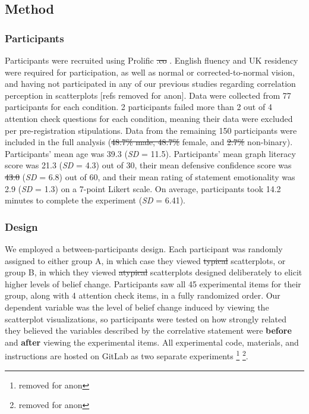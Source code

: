 \documentclass[manuscript,screen,review,anonymous]{acmart}
\providecommand{\DIFaddtex}[1]{{\protect\color{blue}\uwave{#1}}} %
\providecommand{\DIFdeltex}[1]{{\protect\color{red}\sout{#1}}} %
\providecommand{\DIFaddbegin}{} %
\providecommand{\DIFaddend}{} %
\providecommand{\DIFdelbegin}{} %
\providecommand{\DIFdelend}{} %
\providecommand{\DIFadd}[1]{\texorpdfstring{\DIFaddtex{#1}}{#1}} %
\providecommand{\DIFdel}[1]{\texorpdfstring{\DIFdeltex{#1}}{}} %
\newcommand{\DIFscaledelfig}{0.5}
\newlength{\DIFdelgraphicswidth} %
\newlength{\DIFdelgraphicsheight} %
\newcommand{\DIFaddincludegraphics}[2][]{{\color{blue}\fbox{\DIFOincludegraphics[#1]{#2}}}} %
\newcommand{\DIFdelincludegraphics}[2][]{%
\sbox{\DIFdelgraphicsbox}{\DIFOincludegraphics[#1]{#2}}%
\settoboxwidth{\DIFdelgraphicswidth}{\DIFdelgraphicsbox} %
\settoboxtotalheight{\DIFdelgraphicsheight}{\DIFdelgraphicsbox} %
\scalebox{\DIFscaledelfig}{%
\parbox[b]{\DIFdelgraphicswidth}{\usebox{\DIFdelgraphicsbox}\\[-\baselineskip] \rule{\DIFdelgraphicswidth}{0em}}\llap{\resizebox{\DIFdelgraphicswidth}{\DIFdelgraphicsheight}{%
\setlength{\unitlength}{\DIFdelgraphicswidth}%
\begin{picture}(1,1)%
\thicklines\linethickness{2pt} %
{\color[rgb]{1,0,0}\put(0,0){\framebox(1,1){}}}%
{\color[rgb]{1,0,0}\put(0,0){\line( 1,1){1}}}%
{\color[rgb]{1,0,0}\put(0,1){\line(1,-1){1}}}%
\end{picture}%
}\hspace*{3pt}}} %
} %
\DeclareRobustCommand{\DIFaddbegin}{\DIFOaddbegin \let\includegraphics\DIFaddincludegraphics} %
\DeclareRobustCommand{\DIFaddend}{\DIFOaddend \let\includegraphics\DIFOincludegraphics} %
\DeclareRobustCommand{\DIFdelbegin}{\DIFOdelbegin \let\includegraphics\DIFdelincludegraphics} %
\DeclareRobustCommand{\DIFdelend}{\DIFOaddend \let\includegraphics\DIFOincludegraphics} %
\begin{document}
\subsection{Method}\label{sec-method-main}

\subsubsection{Participants}\label{sec-participants-main}

Participants were recruited using Prolific \DIFdelbegin \DIFdel{.co }\DIFdelend \citep{prolific}. English
fluency and UK residency were required for participation, as well as
normal or corrected-to-normal vision, and having not participated in any
of our previous studies regarding correlation perception in scatterplots
{[}refs removed for anon{]}. Data were collected from 77 participants
for each condition. 2 participants failed more than 2 out of 4 attention
check questions for each condition, meaning their data were excluded per
pre-registration stipulations. Data from the remaining 150 participants
were included in the full analysis (\DIFdelbegin \DIFdel{48.7\% male, 48.7\% }\DIFdelend \DIFaddbegin \DIFadd{73 male, 73 }\DIFaddend female, and \DIFdelbegin \DIFdel{2.7\% }\DIFdelend \DIFaddbegin \DIFadd{4
}\DIFaddend non-binary). Participants' mean age was 39.3 (\emph{SD} = 11.5).
Participants' mean graph literacy score was 21.3 (\emph{SD} = 4.3) out
of 30, their mean defensive confidence score was \DIFdelbegin \DIFdel{43.0 }\DIFdelend \DIFaddbegin \DIFadd{43 }\DIFaddend (\emph{SD} = 6.8)
out of 60, and their mean rating of statement emotionality was 2.9
(\emph{SD} = 1.3) on a 7-point Likert scale. On average, participants
took 14.2 minutes to complete the experiment (\emph{SD} = 6.41).

\subsubsection{Design}\label{sec-design-main}

We employed a between-participants design. Each participant was randomly
assigned to either group A, in which case they viewed \DIFdelbegin \DIFdel{typical
}\DIFdelend \DIFaddbegin \DIFadd{standard
}\DIFaddend scatterplots, or group B, in which they viewed \DIFdelbegin \DIFdel{atypical }\DIFdelend \DIFaddbegin \DIFadd{alternative }\DIFaddend scatterplots
designed deliberately to elicit higher levels of belief change.
Participants saw all 45 experimental items for their group, along with 4
attention check items, in a fully randomized order. Our dependent
variable was the level of belief change induced by viewing the
scatterplot visualizations, so participants were tested on how strongly
related they believed the variables described by the correlative
statement were \textbf{before} and \textbf{after} viewing the
experimental items. All experimental code, materials, and instructions
are hosted on GitLab as two separate experiments \footnote{removed for
  anon} \footnote{removed for anon}.
\end{document}
